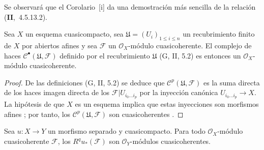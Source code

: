 \begin{remark}[1.4.8]
\label{III.1.4.8}
\label{III.1.4.8-fr}
Se observará que el Corolario~[i] da una demostración más sencilla de la relación (\textbf{II},~4.5.13.2).
\end{remark}

\begin{lemma}[1.4.9]
\label{III.1.4.9}
\label{III.1.4.9-fr}
Sea $X$ un esquema cuasicompacto, sea $\mathfrak U=(U_i)_{1\leq i\leq n}$ un recubrimiento finito de $X$ por abiertos afines y sea $\mathcal F$ un $\mathcal O_X$-módulo cuasicoherente.
El complejo de haces $\mathcal C^\bullet(\mathfrak U,\mathcal F)$ definido por el recubrimiento $\mathfrak U$ \textup{(G, II, 5.2)} es entonces un $\mathcal O_X$-módulo cuasicoherente.
\end{lemma}

\begin{proof}
De las definiciones (G, II, 5.2) se deduce que $\mathcal C^p(\mathfrak U,\mathcal F)$ es la suma directa de los haces imagen directa de los $\mathcal F\vert U_{i_0\ldots i_p}$ por la inyección canónica $U_{i_0\ldots i_p}\to X$.
La hipótesis de que $X$ es un esquema implica que estas inyecciones son morfismos afines ; por tanto, los $\mathcal C^p(\mathfrak U,\mathcal F)$ son cuasicoherentes .
\end{proof}

\begin{proposition}[1.4.10]
\label{III.1.4.10}
\label{III.1.4.10-fr}
Sea $u:X\to Y$ un morfismo separado y cuasicompacto.
Para todo $\mathcal O_X$-módulo cuasicoherente $\mathcal F$, los $R^qu_*(\mathcal F)$ son $\mathcal O_Y$-módulos cuasicoherentes.
\end{proposition}

